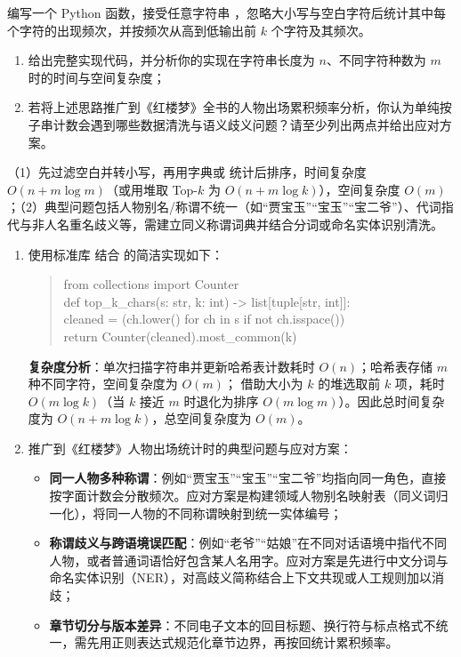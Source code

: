 \begin{exercise}[title={字符频次统计与文本分析扩展},level=advanced,points=18,tags={Python,文本分析,复杂度}]
编写一个 Python 函数，接受任意字符串 ，忽略大小写与空白字符后统计其中每个字符的出现频次，并按频次从高到低输出前 $k$ 个字符及其频次。
\begin{enumerate}
  \item 给出完整实现代码，并分析你的实现在字符串长度为 $n$、不同字符种数为 $m$ 时的时间与空间复杂度；
  \item 若将上述思路推广到《红楼梦》全书的人物出场累积频率分析，你认为单纯按子串计数会遇到哪些数据清洗与语义歧义问题？请至少列出两点并给出应对方案。
\end{enumerate}
\begin{answer}
（1）先过滤空白并转小写，再用字典或  统计后排序，时间复杂度 $O(n + m\log m)$（或用堆取 Top-$k$ 为 $O(n + m\log k)$），空间复杂度 $O(m)$；（2）典型问题包括人物别名/称谓不统一（如“贾宝玉”“宝玉”“宝二爷”）、代词指代与非人名重名歧义等，需建立同义称谓词典并结合分词或命名实体识别清洗。
\end{answer}
\begin{solution}
\begin{enumerate}
  \item 使用标准库  结合  的简洁实现如下：
  \begin{quote}\ttfamily\small
    from collections import Counter\\
    def top\_k\_chars(s: str, k: int) -> list[tuple[str, int]]:\\
    \hspace*{2em}cleaned = (ch.lower() for ch in s if not ch.isspace())\\
    \hspace*{2em}return Counter(cleaned).most\_common(k)
  \end{quote}
  \textbf{复杂度分析}：单次扫描字符串并更新哈希表计数耗时 $O(n)$；哈希表存储 $m$ 种不同字符，空间复杂度为 $O(m)$； 借助大小为 $k$ 的堆选取前 $k$ 项，耗时 $O(m\log k)$（当 $k$ 接近 $m$ 时退化为排序 $O(m\log m)$）。因此总时间复杂度为 $O(n + m\log k)$，总空间复杂度为 $O(m)$。
  \item 推广到《红楼梦》人物出场统计时的典型问题与应对方案：
  \begin{itemize}
    \item \textbf{同一人物多种称谓}：例如“贾宝玉”“宝玉”“宝二爷”均指向同一角色，直接按字面计数会分散频次。应对方案是构建领域人物别名映射表（同义词归一化），将同一人物的不同称谓映射到统一实体编号；
    \item \textbf{称谓歧义与跨语境误匹配}：例如“老爷”“姑娘”在不同对话语境中指代不同人物，或者普通词语恰好包含某人名用字。应对方案是先进行中文分词与命名实体识别（NER），对高歧义简称结合上下文共现或人工规则加以消歧；
    \item \textbf{章节切分与版本差异}：不同电子文本的回目标题、换行符与标点格式不统一，需先用正则表达式规范化章节边界，再按回统计累积频率。
  \end{itemize}
\end{enumerate}
\end{solution}
\end{exercise}
